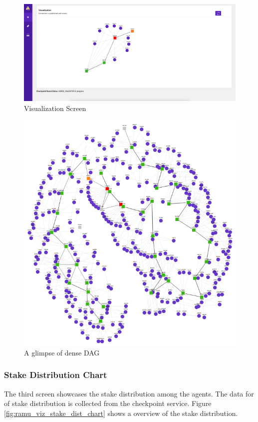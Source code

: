 \begin{figure}[htbp]
    \centering
    \includegraphics[width=0.8\linewidth]{figures/images/ramu/viz_page.png}
	\caption{Visualization Screen}
	\label{fig:ramu_ui_viz_screen}
\end{figure}

\begin{figure}[htbp]
    \centering
    \includegraphics[width=1\linewidth]{figures/images/ramu/v_complex_viz.png}
	\caption{A glimpse of dense DAG}
	\label{fig:ramu_viz_complex}
\end{figure}

\subsubsection{Stake Distribution Chart}
The third screen showcases the stake distribution among the agents. The data for of stake distribution is collected from the checkpoint service. Figure \ref{fig:ramu_viz_stake_dist_chart} shows a overview of the stake distribution.

